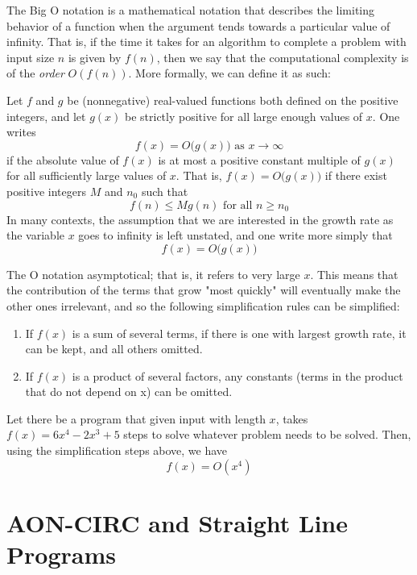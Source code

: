 \documentclass{article}
\begin{document}
  The Big O notation is a mathematical notation that describes the limiting behavior of a function when the argument tends towards a particular value of infinity. That is, if the time it takes for an algorithm to complete a problem with input size $n$ is given by $f(n)$, then we say that the computational complexity is of the \textit{order} $O(f(n))$. More formally, we can define it as such: 

  \begin{definition}
  Let $f$ and $g$ be (nonnegative) real-valued functions both defined on the positive integers, and let $g(x)$ be strictly positive for all large enough values of $x$. One writes
  \[f(x) = O\big( g(x)\big) \text{ as } x \rightarrow \infty\]
  if the absolute value of $f(x)$ is at most a positive constant multiple of $g(x)$ for all sufficiently large values of $x$. That is, $f(x) = O \big(g(x)\big)$ if there exist positive integers $M$ and $n_0$ such that
  \[f(n) \leq M g(n) \text{ for all } n \geq n_0\]
  In many contexts, the assumption that we are interested in the growth rate as the variable $x$ goes to infinity is left unstated, and one write more simply that
  \[f(x) = O\big( g(x)\big)\]
  \end{definition}

  The O notation asymptotical; that is, it refers to very large $x$. This means that the contribution of the terms that grow "most quickly" will eventually make the other ones irrelevant, and so the following simplification rules can be simplified: 
  \begin{enumerate}
      \item If $f(x)$ is a sum of several terms, if there is one with largest growth rate, it can be kept, and all others omitted.
      \item If $f(x)$ is a product of several factors, any constants (terms in the product that do not depend on x) can be omitted.
  \end{enumerate}

  \begin{example}
  Let there be a program that given input with length $x$, takes $f(x) = 6x^4 - 2x^3 + 5$ steps to solve whatever problem needs to be solved. Then, using the simplification steps above, we have 
  \[f(x) = O(x^4)\]
  \end{example}

\section{AON-CIRC and Straight Line Programs}
\end{document}
